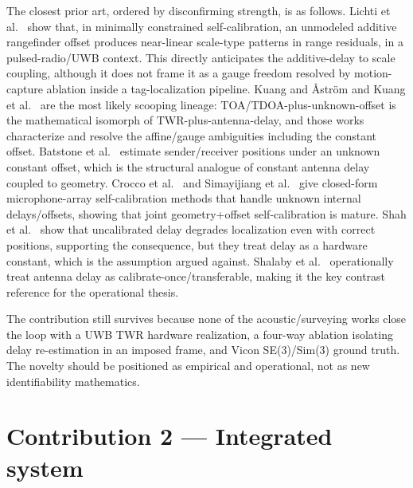 The closest prior art, ordered by disconfirming strength, is as follows. Lichti et al.\ \cite{lichti2010propagation} show that, in minimally constrained self-calibration, an unmodeled additive rangefinder offset produces near-linear scale-type patterns in range residuals, in a pulsed-radio/UWB context. This directly anticipates the additive-delay to scale coupling, although it does not frame it as a gauge freedom resolved by motion-capture ablation inside a tag-localization pipeline. Kuang and {\AA}str{\"o}m \cite{kuang2013stratified} and Kuang et al.\ \cite{kuang2013complete} are the most likely scooping lineage: TOA/TDOA-plus-unknown-offset is the mathematical isomorph of TWR-plus-antenna-delay, and those works characterize and resolve the affine/gauge ambiguities including the constant offset. Batstone et al.\ \cite{batstone2019robust} estimate sender/receiver positions under an unknown constant offset, which is the structural analogue of constant antenna delay coupled to geometry. Crocco et al.\ \cite{crocco2012closed} and Simayijiang et al.\ \cite{simayijiang2015toa} give closed-form microphone-array self-calibration methods that handle unknown internal delays/offsets, showing that joint geometry+offset self-calibration is mature. Shah et al.\ \cite{shah2021antenna} show that uncalibrated delay degrades localization even with correct positions, supporting the consequence, but they treat delay as a hardware constant, which is the assumption argued against. Shalaby et al.\ \cite{shalaby2023calibration} operationally treat antenna delay as calibrate-once/transferable, making it the key contrast reference for the operational thesis.

The contribution still survives because none of the acoustic/surveying works close the loop with a UWB TWR hardware realization, a four-way ablation isolating delay re-estimation in an imposed frame, and Vicon SE(3)/Sim(3) ground truth. The novelty should be positioned as empirical and operational, not as new identifiability mathematics.

\section{Contribution 2 --- Integrated system}


